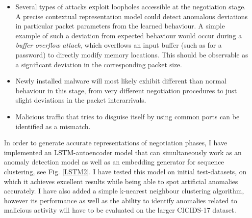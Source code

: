 \documentclass[a4paper,12pt,twoside]{article}
\begin{document}
\begin{itemize}
\item Several types of attacks exploit loopholes accessible at the negotiation stage. A precise contextual representation model could detect anomalous deviations in particular packet parameters from the learned behaviour. A simple example of such a deviation from expected behaviour would occur during a \textit{buffer overflow attack}, which overflows an input buffer (such as for a password) to directly modify memory locations. This should be observable as a significant deviation in the corresponding packet size.

\item Newly installed malware will most likely exhibit different than normal behaviour in this stage, from very different negotiation procedures to just slight deviations in the packet interarrivals.


\item Malicious traffic that tries to disguise itself by using common ports can be identified as a mismatch.


\end{itemize}

In order to generate accurate representations of negotiation phases, I have implemented an LSTM-autoencoder model that can simultaneously work as an anomaly detection model as well as an embedding generator for sequence clustering, see Fig. \ref{LSTM2}. I have tested this model on initial test-datasets, on which it achieves excellent results while being able to spot artificial anomalies accurately. I have also added a simple k-nearest neighbour clustering algorithm, however its performance as well as the ability to identify anomalies related to malicious activity will have to be evaluated on the larger CICIDS-17 dataset.  
\end{document}
